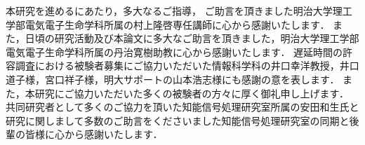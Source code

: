 \begin{acknowledgement}
本研究を進めるにあたり，多大なるご指導，
ご助言を頂きました明治大学理工学部電気電子生命学科所属の村上隆啓専任講師に心から感謝いたします．
また，日頃の研究活動及び本論文に多大なご助言を頂きました，明治大学理工学部電気電子生命学科所属の丹治寛樹助教に心から感謝いたします．
遅延時間の許容調査における被験者募集にご協力いただいた情報科学科の井口幸洋教授，井口道子様，宮口祥子様，明大サポートの山本浩志様にも感謝の意を表します．
また，本研究にご協力いただいた多くの被験者の方々に厚く御礼申し上げます．
共同研究者として多くのご協力を頂いた知能信号処理研究室所属の安田和生氏と研究に関しまして多数のご助言をくださいました知能信号処理研究室の同期と後輩の皆様に心から感謝いたします．
\makesignature
\end{acknowledgement}
